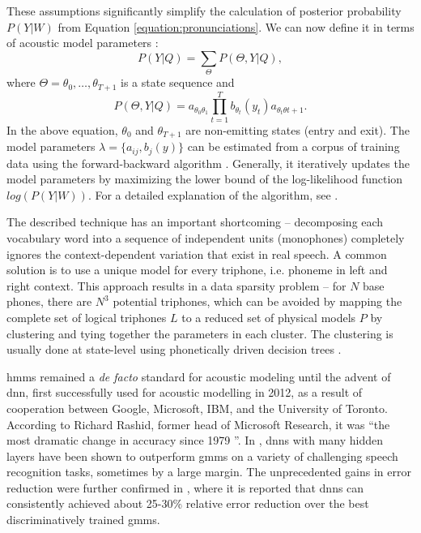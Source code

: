 These assumptions significantly simplify the calculation of posterior probability $P(Y|W)$ from Equation \ref{equation:pronunciations}. We can now define it in terms of acoustic model parameters \cite{lu2013subspace}:
\begin{equation}
  P(Y|Q)=\sum_{\Theta}P(\Theta, Y|Q),
\end{equation}
where $\Theta=\theta_{0}, \ldots, \theta_{T+1}$ is a state sequence and
\begin{equation}
  \label{equation:states}
  P(\Theta, Y|Q)=a_{\theta_{0}\theta_{1}}\prod_{t=1}^{T}b_{\theta_{t}}(y_{t})a_{\theta_{t}\theta{t+1}}.
\end{equation}
In the above equation, $\theta_{0}$ and $\theta_{T+1}$ are non-emitting states (entry and exit). The model parameters $\lambda=\{a_{ij}, b_{j}(y)\}$ can be estimated from a corpus of training data using the forward-backward algorithm \cite{baum1970maximization}. Generally, it iteratively updates the model parameters by maximizing the lower bound of the log-likelihood function $log(P(Y|W))$. For a detailed explanation of the algorithm, see \cite{rabiner1986introduction}.

The described technique has an important shortcoming -- decomposing each vocabulary word into a sequence of independent units (monophones) completely ignores the context-dependent variation that exist in real speech. A common solution is to use a unique model for every triphone, i.e. phoneme in left and right context. This approach results in a data sparsity problem -- for $N$ base phones, there are $N^{3}$ potential triphones, which can be avoided by mapping the complete set of logical triphones $L$ to a reduced set of physical models $P$ by clustering and tying together the parameters in each cluster. The clustering is usually done at state-level using phonetically driven decision trees \cite{gales2008application}.

\Glspl{hmm} remained a \textit{de facto} standard for acoustic modeling until the advent of \gls{dnn}, first successfully used for acoustic modelling in 2012, as a result of cooperation between Google, Microsoft, IBM, and the University of Toronto. According to Richard Rashid, former head of Microsoft Research, it was ``the most dramatic change in accuracy since 1979 \cite{markoff2012scientists}''. In \cite{hinton2012deep}, \glspl{dnn} with many hidden layers have been shown to outperform \glspl{gmm} on a variety of challenging speech recognition tasks, sometimes by a large margin. The unprecedented gains in error reduction were further confirmed in \cite{pan2012investigation}, where it is reported that \glspl{dnn} can consistently achieved about 25-30\% relative error reduction over the best discriminatively trained \glspl{gmm}.

